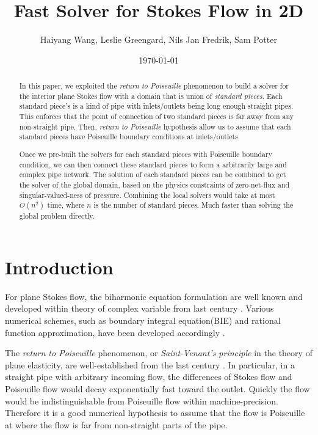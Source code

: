 \documentclass[10pt,twocolumn]{article}
\author{Haiyang Wang, Leslie Greengard, Nils Jan Fredrik, Sam Potter}
\date{\today}
\title{Fast Solver for Stokes Flow in 2D}
\begin{document}
\maketitle

\begin{abstract}
  In this paper, we exploited the \textit{return to Poiseuille} phenomenon
   to build a solver for the interior plane Stokes flow
   with a domain that is union of \textit{standard pieces}. 
  Each standard piece's is a kind of pipe with inlets/outlets 
  being long enough straight pipes. This enforces that 
  the point of connection of two standard pieces is far away
  from any non-straight pipe. 
  Then, \textit{return to Poiseuille} hypothesis allow us to assume 
  that each standard pieces have Poiseuille boundary conditions at
  inlets/outlets. 
  
  Once we pre-built the solvers for each standard pieces with Poiseuille 
  boundary condition, 
  we can then connect these standard pieces to form a arbitrarily large and complex pipe network. The solution of each standard pieces can be combined  to get the solver of the global domain, based on 
  the physics constraints of  zero-net-flux and singular-valued-ness of pressure. 
  Combining the local solvers would take at most $O(n^2)$ time, 
  where $n$ is the number of standard pieces. 
  Much faster than solving the global problem directly.
\end{abstract}

\section{Introduction}

For plane Stokes flow, the biharmonic equation formulation are well known 
and developed within theory of complex variable from last century \cite{ladyzhenskayaMathematicalTheoryViscous1964}. 
Various numerical schemes, such as boundary integral equation(BIE) and rational function approximation, 
have been developed accordingly \cite{greengardIntegralEquationMethods1996,trefethenApproximationTheoryApproximation2019}. 


The \textit{return to Poiseuille} phenomenon, or \textit{Saint-Venant's principle} in the theory of plane elasticity, are well-established 
from the last century \cite{coRecentDevelopmentsConcerning1983,gregoryTractionBoundaryValue1980,horganDECAYESTIMATESBIHARMONIC1989}. 
In particular, in a straight pipe with arbitrary incoming flow, the differences of Stokes flow and Poiseuille flow would decay exponentially fast toward the outlet. 
Quickly the flow would be indistinguishable from Poiseuille flow within machine-precision. 
Therefore it is a good numerical hypothesis to assume that the flow is Poiseuille at where the flow is far from non-straight parts 
of the pipe.
\end{document}
